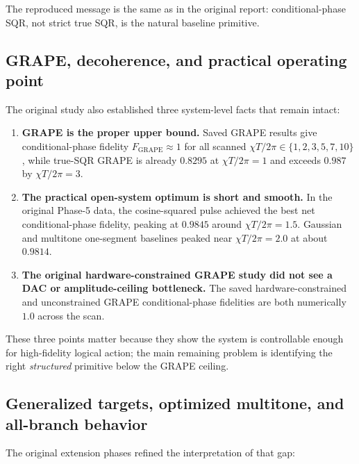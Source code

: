 \documentclass[11pt]{article}
\begin{document}
The reproduced message is the same as in the original report: conditional-phase
SQR, not strict true SQR, is the natural baseline primitive.

\subsection{GRAPE, decoherence, and practical operating point}

The original study also established three system-level facts that remain intact:

\begin{enumerate}[label=\arabic*.]
    \item \textbf{GRAPE is the proper upper bound.}
    Saved GRAPE results give conditional-phase fidelity
    $F_{\mathrm{GRAPE}} \approx 1$ for all scanned
    $\chi T/2\pi \in \{1,2,3,5,7,10\}$, while true-SQR GRAPE is already
    $0.8295$ at $\chi T/2\pi = 1$ and exceeds $0.987$ by $\chi T/2\pi = 3$.

    \item \textbf{The practical open-system optimum is short and smooth.}
    In the original Phase-5 data, the cosine-squared pulse achieved the best
    net conditional-phase fidelity, peaking at $0.9845$ around
    $\chi T/2\pi = 1.5$. Gaussian and multitone one-segment baselines peaked
    near $\chi T/2\pi = 2.0$ at about $0.9814$.

    \item \textbf{The original hardware-constrained GRAPE study did not see a DAC
    or amplitude-ceiling bottleneck.}
    The saved hardware-constrained and unconstrained GRAPE conditional-phase
    fidelities are both numerically $1.0$ across the scan.
\end{enumerate}

These three points matter because they show the system is controllable enough
for high-fidelity logical action; the main remaining problem is identifying the
right \emph{structured} primitive below the GRAPE ceiling.

\subsection{Generalized targets, optimized multitone, and all-branch behavior}

The original extension phases refined the interpretation of that gap:
\end{document}
